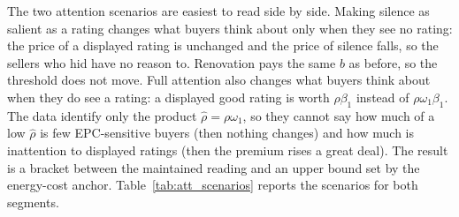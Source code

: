 The two attention scenarios are easiest to read side by side. Making silence as salient as a rating changes what buyers think about only when they see no rating: the price of a displayed rating is unchanged and the price of silence falls, so the sellers who hid have no reason to. Renovation pays the same $b$ as before, so the threshold does not move. Full attention also changes what buyers think about when they do see a rating: a displayed good rating is worth $\rho\beta_1$ instead of $\rho\omega_1\beta_1$. The data identify only the product $\hat\rho=\rho\omega_1$, so they cannot say how much of a low $\hat\rho$ is few EPC-sensitive buyers (then nothing changes) and how much is inattention to displayed ratings (then the premium rises a great deal). The result is a bracket between the maintained reading and an upper bound set by the energy-cost anchor. Table~\ref{tab:att_scenarios} reports the scenarios for both segments.

